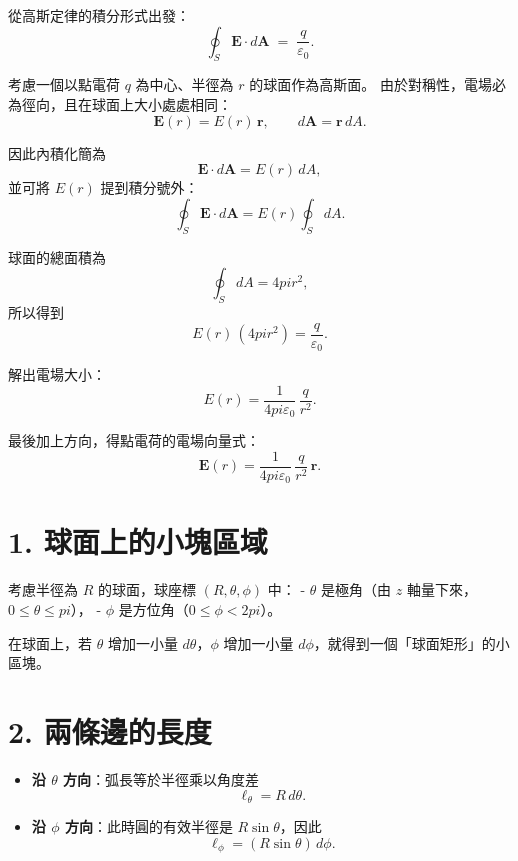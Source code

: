 \documentclass{article}
\def\pi{pi}%
\def\hat#1{#1}%
\begin{document}
從高斯定律的積分形式出發：
\begin{equation}
\oint_{S} \mathbf{E}\cdot d\mathbf{A} \;=\; \frac{q}{\varepsilon_0}.
\end{equation}

考慮一個以點電荷 $q$ 為中心、半徑為 $r$ 的球面作為高斯面。  
由於對稱性，電場必為徑向，且在球面上大小處處相同：
\[
\mathbf{E}(r) = E(r)\,\hat{\mathbf{r}}, 
\qquad
d\mathbf{A} = \hat{\mathbf{r}}\,dA.
\]

因此內積化簡為
\[
\mathbf{E}\cdot d\mathbf{A} = E(r)\,dA,
\]
並可將 $E(r)$ 提到積分號外：
\begin{equation}
\oint_{S} \mathbf{E}\cdot d\mathbf{A} = E(r)\oint_{S} dA.
\end{equation}

球面的總面積為
\[
\oint_{S} dA = 4\pi r^2,
\]
所以得到
\begin{equation}
E(r)\,(4\pi r^2) = \frac{q}{\varepsilon_0}.
\end{equation}

解出電場大小：
\begin{equation}
E(r) = \frac{1}{4\pi\varepsilon_0}\,\frac{q}{r^2}.
\end{equation}

最後加上方向，得點電荷的電場向量式：
\begin{equation}
\mathbf{E}(r) = \frac{1}{4\pi\varepsilon_0}\,\frac{q}{r^2}\,\hat{\mathbf{r}}.
\end{equation}
\section*{1. 球面上的小塊區域}
考慮半徑為 $R$ 的球面，球座標 $(R,\theta,\phi)$ 中：
- $\theta$ 是極角（由 $z$ 軸量下來，$0\le \theta \le \pi$），
- $\phi$ 是方位角（$0\le \phi <2\pi$）。

在球面上，若 $\theta$ 增加一小量 $d\theta$，$\phi$ 增加一小量 $d\phi$，就得到一個「球面矩形」的小區塊。

\section*{2. 兩條邊的長度}
\begin{itemize}
  \item \textbf{沿 $\theta$ 方向}：弧長等於半徑乘以角度差
  \[
  \ell_\theta = R\, d\theta.
  \]
  \item \textbf{沿 $\phi$ 方向}：此時圓的有效半徑是 $R\sin\theta$，因此
  \[
  \ell_\phi = (R\sin\theta)\, d\phi.
  \]
\end{itemize}
\end{document}

